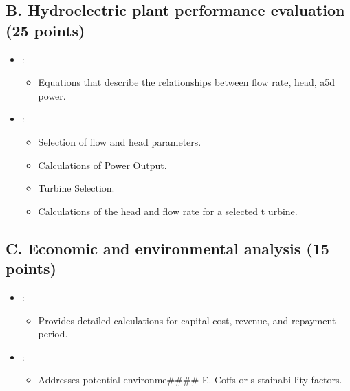 \documentclass[letterpaper,10pt,english]{jupyterBook}
\begin{document}
\subsection{B. Hydroelectric plant performance evaluation (25 points)}
\label{\detokenize{ProjectSyllabus:b-hydroelectric-plant-performance-evaluation-25-points}}\begin{itemize}
\item {} 
\sphinxAtStartPar
{}:
\begin{itemize}
\item {} 
\sphinxAtStartPar
Equations that describe the relationships between flow rate,
head, a5d power.

\end{itemize}

\item {} 
\sphinxAtStartPar
{}:
\begin{itemize}
\item {} 
\sphinxAtStartPar
Selection of flow and head parameters.

\item {} 
\sphinxAtStartPar
Calculations of Power Output.

\item {} 
\sphinxAtStartPar
Turbine Selection.

\item {} 
\sphinxAtStartPar
Calculations of  the head and flow rate for a selected t urbine.

\end{itemize}

\end{itemize}


\subsection{C. Economic and environmental analysis (15 points)}
\label{\detokenize{ProjectSyllabus:c-economic-and-environmental-analysis-15-points}}\begin{itemize}
\item {} 
\sphinxAtStartPar
{}:
\begin{itemize}
\item {} 
\sphinxAtStartPar
Provides detailed calculations for capital cost, revenue, and
repayment period.

\end{itemize}

\item {} 
\sphinxAtStartPar
{}:
\begin{itemize}
\item {} 
\sphinxAtStartPar
Addresses potential environme\#\#\#\# E. C\sphinxhyphen{}offs or s stainabi lity
factors.

\end{itemize}

\end{itemize}
\end{document}
